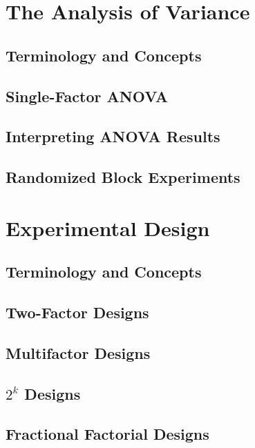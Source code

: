 \documentclass{article}
\begin{document}
\clearpage	
\section{The Analysis of Variance} %

	\subsection{Terminology and Concepts} %
	
	\subsection{Single-Factor ANOVA} %
	
	\subsection{Interpreting ANOVA Results} %
	
	\subsection{Randomized Block Experiments} %

\clearpage	
\section{Experimental Design} %

	\subsection{Terminology and Concepts} %
	
	\subsection{Two-Factor Designs} %
	
	\subsection{Multifactor Designs} %
	
	\subsection{$2^k$ Designs} %
	
	\subsection{Fractional Factorial Designs} %
\end{document}
